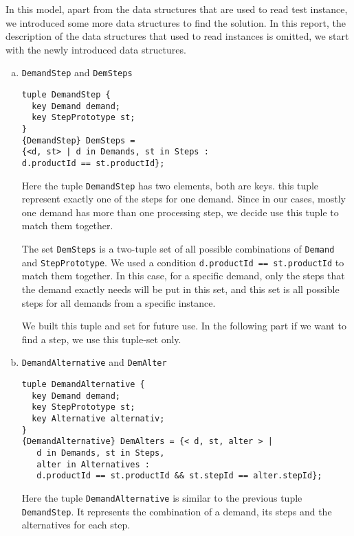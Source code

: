 \documentclass[a4paper, 12pt]{article}
\begin{document}
In this model, apart from the data structures that are used to read test instance, we introduced some more data structures to find the solution. In this report, the description of the data structures that used to read instances is omitted, we start with the newly introduced data structures. 
\begin{enumerate}[a.~]
\item \texttt{DemandStep} and \texttt{DemSteps}
\begin{lstlisting}
tuple DemandStep {
  key Demand demand;
  key StepPrototype st; 
}
{DemandStep} DemSteps = 
{<d, st> | d in Demands, st in Steps : 
d.productId == st.productId};
\end{lstlisting}
Here the tuple \texttt{DemandStep} has two elements, both are keys. this tuple represent exactly one of the steps for one demand. Since in our cases, mostly one demand has more than one processing step, we decide use this tuple to match them together. 

The set \texttt{DemSteps} is a two-tuple set of all possible combinations of \texttt{Demand} and \texttt{StepPrototype}. We used a condition \texttt{d.productId == st.productId} to match them together. In this case, for a specific demand, only the steps that the demand exactly needs will be put in this set, and this set is all possible steps for all demands from a specific instance. 

We built this tuple and set for future use. In the following part if we want to find a step, we use this tuple-set only. 
\item \texttt{DemandAlternative} and \texttt{DemAlter}
\begin{lstlisting}
tuple DemandAlternative {
  key Demand demand;
  key StepPrototype st;
  key Alternative alternativ;
}
{DemandAlternative} DemAlters = {< d, st, alter > | 
   d in Demands, st in Steps,
   alter in Alternatives :
   d.productId == st.productId && st.stepId == alter.stepId};
\end{lstlisting}
Here the tuple \texttt{DemandAlternative} is similar to the previous tuple \texttt{DemandStep}. It represents the combination of a demand, its steps and the alternatives for each step. 


\end{enumerate}
\end{document}
